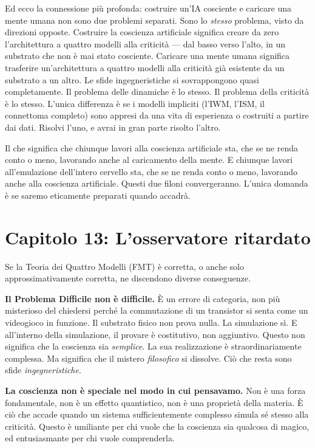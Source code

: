 \documentclass[11pt, twoside, openright]{book}
\begin{document}
Ed ecco la connessione più profonda: costruire un'IA cosciente e caricare una mente umana non sono due problemi separati. Sono lo \textit{stesso} problema, visto da direzioni opposte. Costruire la coscienza artificiale significa creare da zero l'architettura a quattro modelli alla criticità --- dal basso verso l'alto, in un substrato che non è mai stato cosciente. Caricare una mente umana significa trasferire un'architettura a quattro modelli alla criticità già esistente da un substrato a un altro. Le sfide ingegneristiche si sovrappongono quasi completamente. Il problema delle dinamiche è lo stesso. Il problema della criticità è lo stesso. L'unica differenza è se i modelli impliciti (l'IWM, l'ISM, il connettoma completo) sono appresi da una vita di esperienza o costruiti a partire dai dati. Risolvi l'uno, e avrai in gran parte risolto l'altro.

Il che significa che chiunque lavori alla coscienza artificiale sta, che se ne renda conto o meno, lavorando anche al caricamento della mente. E chiunque lavori all'emulazione dell'intero cervello sta, che se ne renda conto o meno, lavorando anche alla coscienza artificiale. Questi due filoni convergeranno. L'unica domanda è se saremo eticamente preparati quando accadrà.


\chapter*{Capitolo 13: L'osservatore ritardato}

Se la Teoria dei Quattro Modelli (FMT) è corretta, o anche solo approssimativamente corretta, ne discendono diverse conseguenze.

\textbf{Il Problema Difficile non è difficile.} È un errore di categoria, non più misterioso del chiedersi perché la commutazione di un transistor si senta come un videogioco in funzione. Il substrato fisico non prova nulla. La simulazione sì. E all'interno della simulazione, il provare è costitutivo, non aggiuntivo. Questo non significa che la coscienza sia \textit{semplice}. La sua realizzazione è straordinariamente complessa. Ma significa che il mistero \textit{filosofico} si dissolve. Ciò che resta sono sfide \textit{ingegneristiche}.

\textbf{La coscienza non è speciale nel modo in cui pensavamo.} Non è una forza fondamentale, non è un effetto quantistico, non è una proprietà della materia. È ciò che accade quando un sistema sufficientemente complesso simula sé stesso alla criticità. Questo è umiliante per chi vuole che la coscienza sia qualcosa di magico, ed entusiasmante per chi vuole comprenderla.
\end{document}
